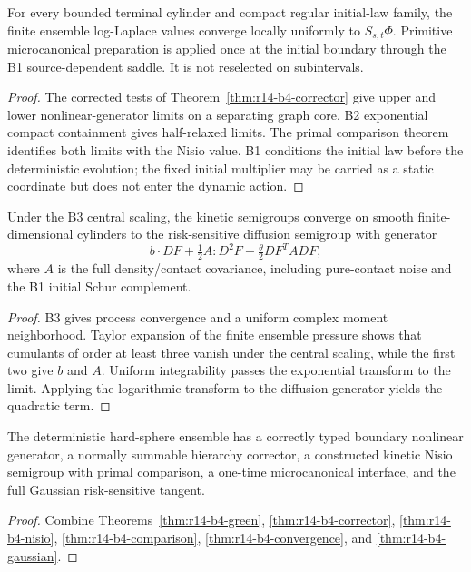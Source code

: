 \begin{theorem}
\label{thm:r14-b4-convergence}
For every bounded terminal cylinder and compact regular initial-law family,
the finite ensemble log-Laplace values converge locally uniformly to
\(S_{s,t}\Phi\).  Primitive microcanonical preparation is applied once at
the initial boundary through the B1 source-dependent saddle.  It is not
reselected on subintervals.
\end{theorem}

\begin{proof}
The corrected tests of
Theorem~\ref{thm:r14-b4-corrector} give upper and lower nonlinear-generator
limits on a separating graph core.  B2 exponential compact containment gives
half-relaxed limits.  The primal comparison theorem identifies both limits
with the Nisio value.  B1 conditions the initial law before the deterministic
evolution; the fixed initial multiplier may be carried as a static coordinate
but does not enter the dynamic action.
\end{proof}

\begin{theorem}
\label{thm:r14-b4-gaussian}
Under the B3 central scaling, the kinetic semigroups converge on smooth
finite-dimensional cylinders to the risk-sensitive diffusion semigroup with
generator
\[
 b\cdot DF+\tfrac12A:D^2F+\tfrac\theta2DF^TADF,
\]
where \(A\) is the full density/contact covariance, including pure-contact
noise and the B1 initial Schur complement.
\end{theorem}

\begin{proof}
B3 gives process convergence and a uniform complex moment neighborhood.
Taylor expansion of the finite ensemble pressure shows that cumulants of
order at least three vanish under the central scaling, while the first two
give \(b\) and \(A\).  Uniform integrability passes the exponential
transform to the limit.  Applying the logarithmic transform to the diffusion
generator yields the quadratic term.
\end{proof}

\begin{theorem}
\label{thm:r14-b4-main}
The deterministic hard-sphere ensemble has a correctly typed boundary
nonlinear generator, a normally summable hierarchy corrector, a constructed
kinetic Nisio semigroup with primal comparison, a one-time microcanonical
interface, and the full Gaussian risk-sensitive tangent.
\end{theorem}

\begin{proof}
Combine Theorems~\ref{thm:r14-b4-green},
\ref{thm:r14-b4-corrector}, \ref{thm:r14-b4-nisio},
\ref{thm:r14-b4-comparison}, \ref{thm:r14-b4-convergence}, and
\ref{thm:r14-b4-gaussian}.
\end{proof}
